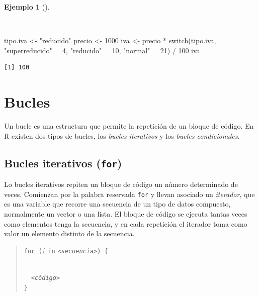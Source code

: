 \documentclass[
  a4paper,
]{scrreport}
\newenvironment{Shaded}{\begin{snugshade}}{\end{snugshade}}
\newcommand{\ControlFlowTok}[1]{\textcolor[rgb]{0.00,0.23,0.31}{#1}}
\newcommand{\DecValTok}[1]{\textcolor[rgb]{0.68,0.00,0.00}{#1}}
\newcommand{\NormalTok}[1]{\textcolor[rgb]{0.00,0.23,0.31}{#1}}
\newcommand{\OtherTok}[1]{\textcolor[rgb]{0.00,0.23,0.31}{#1}}
\newcommand{\SpecialCharTok}[1]{\textcolor[rgb]{0.37,0.37,0.37}{#1}}
\newcommand{\StringTok}[1]{\textcolor[rgb]{0.13,0.47,0.30}{#1}}
\theoremstyle{definition}
\theoremstyle{definition}
\newtheorem{example}{Ejemplo}[chapter]
\theoremstyle{remark}
\begin{document}
\begin{example}[]\protect\hypertarget{exm-condicional-switch}{}\label{exm-condicional-switch}

~

\begin{Shaded}
\begin{Highlighting}[]
\NormalTok{tipo.iva }\OtherTok{\textless{}{-}} \StringTok{"reducido"}
\NormalTok{precio }\OtherTok{\textless{}{-}} \DecValTok{1000}
\NormalTok{iva }\OtherTok{\textless{}{-}}\NormalTok{ precio }\SpecialCharTok{*} \ControlFlowTok{switch}\NormalTok{(tipo.iva, }\StringTok{"superreducido"} \OtherTok{=} \DecValTok{4}\NormalTok{, }\StringTok{"reducido"} \OtherTok{=} \DecValTok{10}\NormalTok{, }\StringTok{"normal"} \OtherTok{=} \DecValTok{21}\NormalTok{) }\SpecialCharTok{/} \DecValTok{100}
\NormalTok{iva}
\end{Highlighting}
\end{Shaded}

\begin{verbatim}
[1] 100
\end{verbatim}

\end{example}

\hypertarget{bucles}{%
\section{Bucles}\label{bucles}}

Un bucle es una estructura que permite la repetición de un bloque de
código. En R existen dos tipos de bucles, los \emph{bucles iterativos} y
los \emph{bucles condicionales}.

\hypertarget{bucles-iterativos-for}{%
\subsection{\texorpdfstring{Bucles iterativos
(\texttt{for})}{Bucles iterativos (for)}}\label{bucles-iterativos-for}}

Lo bucles iterativos repiten un bloque de código un número determinado
de veces. Comienzan por la palabra reservada \texttt{for} y llevan
asociado un \emph{iterador}, que es una variable que recorre una
secuencia de un tipo de datos compuesto, normalmente un vector o una
lista. El bloque de código se ejecuta tantas veces como elementos tenga
la secuencia, y en cada repetición el iterador toma como valor un
elemento distinto de la secuencia.

\begin{quote}
\texttt{for\ (}\emph{\texttt{i}} \texttt{in}
\emph{\texttt{\textless{}secuencia\textgreater{}}}\texttt{)\ \{}\strut \\
  \emph{\texttt{\textless{}código\textgreater{}}}\\
\texttt{\}}
\end{quote}
\end{document}
